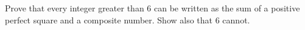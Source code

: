 Prove that every integer greater than $6$ can be written as the sum of a positive perfect square and a composite number. Show also that $6$ cannot.

